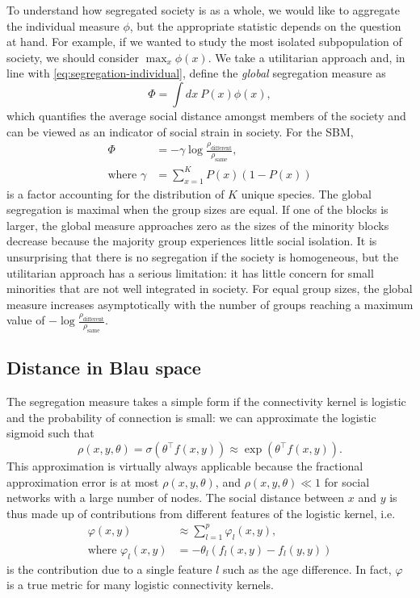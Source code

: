 \documentclass{scrartcl}
\newcommand{\expit}{\sigma}
\newcommand{\transpose}[1]{#1^\intercal}
\begin{document}
To understand how segregated society is as a whole, we would like to aggregate the individual measure $\phi$, but the appropriate statistic depends on the question at hand. For example, if we wanted to study the most isolated subpopulation of society, we should consider $\max_x\phi(x)$. We take a utilitarian approach and, in line with \cref{eq:segregation-individual}, define the \emph{global} segregation measure as
\begin{equation}
    \Phi = \int dx\ P(x) \phi(x),\label{eq:segregation-global}
\end{equation}
which quantifies the average social distance amongst members of the society and can be viewed as an indicator of social strain in society. For the SBM,
\begin{align}
    \Phi&= -\gamma\log\frac{\rho_\mathrm{different}}{\rho_\mathrm{same}},\nonumber \\
    \text{where }\gamma&=\sum_{x=1}^K P(x) \left(1 - P(x)\right)\label{eq:segregation-distributional-factor}
\end{align}
is a factor accounting for the distribution of $K$ unique species. The global segregation is maximal when the group sizes are equal. If one of the blocks is larger, the global measure approaches zero as the sizes of the minority blocks decrease because the majority group experiences little social isolation. It is unsurprising that there is no segregation if the society is homogeneous, but the utilitarian approach has a serious limitation: it has little concern for small minorities that are not well integrated in society. For equal group sizes, the global measure increases asymptotically with the number of groups reaching a maximum value of $-\log\frac{\rho_\mathrm{different}}{\rho_\mathrm{same}}$.

\subsection{Distance in Blau space\label{sec:segregation-distance}}

The segregation measure takes a simple form if the connectivity kernel is logistic and the probability of connection is small: we can approximate the logistic sigmoid such that
\[
    \rho(x, y,\theta)=\expit\left(\transpose{\theta}f(x, y)\right)\approx\exp\left(\transpose{\theta}f(x, y)\right).
\]
This approximation is virtually always applicable because the fractional approximation error is at most $\rho(x,y,\theta)$, and $\rho(x,y,\theta)\ll 1$ for social networks with a large number of nodes. The social distance between $x$ and $y$ is thus made up of contributions from different features of the logistic kernel, i.e.
\begin{align}
    \varphi(x,y) &\approx \sum_{l=1}^p\varphi_l(x, y),\label{eq:segregation-pairwise-logistic}\\
    \text{where }\varphi_l(x, y) &= -\theta_l\left(f_l(x, y) - f_l(y, y)\right)\label{eq:segregation-pairwise-contribution}
\end{align}
is the contribution due to a single feature $l$ such as the age difference. In fact, $\varphi$ is a true metric for many logistic connectivity kernels.
\end{document}
